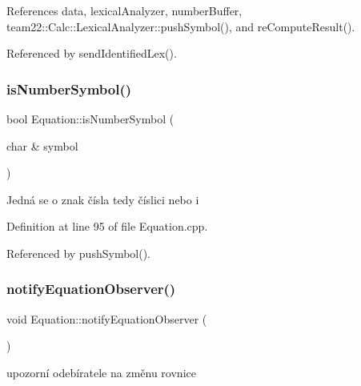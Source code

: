 References data, lexical\+Analyzer, number\+Buffer, team22\+::\+Calc\+::\+Lexical\+Analyzer\+::push\+Symbol(), and re\+Compute\+Result().



Referenced by send\+Identified\+Lex().

\mbox{\label{classteam22_1_1_calc_1_1_equation_afa4b44cfa408f74370851f7f64f55743}} 
\subsubsection{\texorpdfstring{is\+Number\+Symbol()}{isNumberSymbol()}}
{\footnotesize\ttfamily bool Equation\+::is\+Number\+Symbol (\begin{DoxyParamCaption}\item[{char \&}]{symbol }\end{DoxyParamCaption})\hspace{0.3cm}{\ttfamily [private]}}

Jedná se o znak čísla tedy číslici nebo i 

Definition at line 95 of file Equation.\+cpp.



Referenced by push\+Symbol().

\mbox{\label{classteam22_1_1_calc_1_1_equation_acb90f7fefbd20c57864de0ed691bb65f}} 
\subsubsection{\texorpdfstring{notify\+Equation\+Observer()}{notifyEquationObserver()}}
{\footnotesize\ttfamily void Equation\+::notify\+Equation\+Observer (\begin{DoxyParamCaption}{ }\end{DoxyParamCaption})\hspace{0.3cm}{\ttfamily [private]}}

upozorní odebíratele na změnu rovnice 

